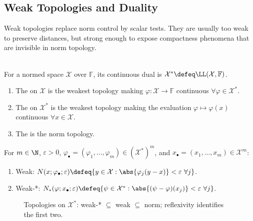 \subsection{Weak Topologies and Duality}

%

Weak topologies replace norm control by scalar tests. They are usually too weak to preserve distances, but strong enough to expose compactness phenomena that are invisible in norm topology.

\begin{definition} \label{def:weak-and-weak-star-topologies} \\
For a normed space $\mathcal{X}$ over $\mathbb{F}$, its continuous dual is $\mathcal{X}^*\defeq\LL(\mathcal{X},\mathbb{F})$.
\begin{enumerate}[label=(\roman*)]
\setlength{\itemsep}{0pt}
\item The  on $\mathcal{X}$ is the weakest topology making $\varphi:\mathcal{X}\to\mathbb{F}$ continuous $\forall\varphi\in\mathcal{X}^*$.
\item The  on $\mathcal{X}^*$ is the weakest topology making the evaluation $\varphi\mapsto\varphi(x)$ continuous $\forall x\in\mathcal{X}$.
\item The  is the norm topology.
\end{enumerate}
For $m\in\N$, $\varepsilon>0$, $\varphi_\bullet=(\varphi_1,\ldots,\varphi_m)\in(\mathcal{X}^*)^m$, and $x_\bullet=(x_1,\ldots,x_m)\in\mathcal{X}^m$:
\begin{enumerate}[label=(\roman*)]
\setlength{\itemsep}{0pt}
\item Weak: $N(x;\varphi_\bullet;\varepsilon)\defeq\{y\in\mathcal{X}:\abs{\varphi_j(y-x)}<\varepsilon\ \forall j\}$.
\item Weak-*: $N_*(\varphi;x_\bullet;\varepsilon)\defeq\{\psi\in\mathcal{X}^*:\abs{(\psi-\varphi)(x_j)}<\varepsilon\ \forall j\}$.
\end{enumerate}
\end{definition}

\begin{figure}[H]
  \centering
  
  \caption{Topologies on $\mathcal X^*$: weak-* $\subseteq$ weak $\subseteq$ norm; reflexivity identifies the first two.}
  \label{fig:dual-topology-hierarchy}
\end{figure}

